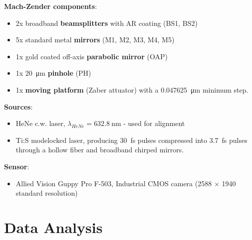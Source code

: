 \documentclass[11pt]{beamer}
\begin{document}
\begin{frame}
\textbf{Mach-Zender components}:\\
\begin{itemize}
	\item 2x broadband \textbf{beamsplitters} with AR coating (BS1, BS2)
	\item 5x standard metal \textbf{mirrors} (M1, M2, M3, M4, M5)
	\item 1x gold coated off-axis \textbf{parabolic mirror} (OAP)
	\item 1x \SI{20}{\um} \textbf{pinhole} (PH)
	\item 1x \textbf{moving platform} (Zaber attuator) with a \SI{0.047625}{\um} minimum step.
\end{itemize}
\end{frame}

\begin{frame}
\textbf{Sources}:\\
\begin{itemize}
	\item HeNe c.w. laser, $\lambda_{HeNe} = \SI{632.8}{\nm}$ - used for alignment
	\item Ti:S modelocked laser, producing \SI{30}{\fs} pulses compressed into \SI{3.7}{\fs} pulses through a hollow fiber and broadband chirped mirrors.
\end{itemize}
	
\textbf{Sensor}:\\
\begin{itemize}
	\item Allied Vision Guppy Pro F-503, Industrial CMOS camera (2588 $\times$ 1940 standard resolution)
\end{itemize}

\end{frame}

\section{Data Analysis}
\end{document}
